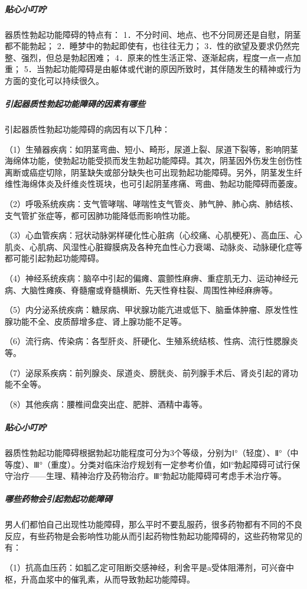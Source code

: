 \subparagraph{贴心小叮咛}

器质性勃起功能障碍的特点有：
1．不分时间、地点、也不分同房还是自慰，阴茎都不能勃起；
2．睡梦中的勃起即使有，也往往无力；
3．性的欲望及要求仍然完整、强烈，但总是勃起困难；
4．原来的性生活正常、逐渐起病，程度一点一点加重；
5．当勃起功能障碍是由躯体或代谢的原因所致时，其伴随发生的精神或行为方面的变化可以持续很久。

\subparagraph{引起器质性勃起功能障碍的因素有哪些}

引起器质性勃起功能障碍的病因有以下几种：

（1）生殖器疾病：如阴茎弯曲、短小、畸形，尿道上裂、尿道下裂等，影响阴茎海绵体功能，使勃起功能受损而发生勃起功能障碍。其次，阴茎因外伤发生创伤性离断或癌症切除，阴茎缺失或部分缺失也可出现勃起功能障碍。另外，阴茎发生纤维性海绵体炎及纤维炎性斑块，也可引起阴茎疼痛、弯曲、勃起功能障碍而萎废。

（2）呼吸系统疾病：支气管哮喘、哮喘性支气管炎、肺气肿、肺心病、肺结核、支气管扩张症等，都可因肺功能降低而影响性功能。

（3）心血管疾病：冠状动脉粥样硬化性心脏病（心绞痛、心肌梗死）、高血压、心肌炎、心肌病、风湿性心脏瓣膜病及各种充血性心力衰竭、动脉炎、动脉硬化症等都可能引起勃起功能障碍。

（4）神经系统疾病：脑卒中引起的偏瘫、震颤性麻痹、重症肌无力、运动神经元病、大脑性瘫痪、脊髓瘤或脊髓横断、先天性脊柱裂、周围性神经麻痹等。

（5）内分泌系统疾病：糖尿病、甲状腺功能亢进或低下、脑垂体肿瘤、原发性性腺功能不全、皮质醇增多症、肾上腺功能不足等。

（6）流行病、传染病：各型肝炎、肝硬化、生殖系统结核、性病、流行性腮腺炎等。

（7）泌尿系疾病：前列腺炎、尿道炎、膀胱炎、前列腺手术后、肾炎引起的肾功能不全等。

（8）其他疾病：腰椎间盘突出症、肥胖、酒精中毒等。

\subparagraph{贴心小叮咛}

器质性勃起功能障碍根据勃起功能程度可分为3个等级，分别为Ⅰ°（轻度）、Ⅱ°（中等度）、Ⅲ°（重度）。分类对临床治疗规划有一定参考价值，如Ⅰ°勃起障碍可试行保守治疗——生理、精神治疗及药物治疗。Ⅲ°勃起功能障碍可考虑手术治疗等。

\subparagraph{哪些药物会引起勃起功能障碍}

男人们都怕自己出现性功能障碍，那么平时不要乱服药，很多药物都有不同的不良反应，有些药物是会影响性功能从而引起药物性勃起功能障碍的，这些药物常见的有：

（1）抗高血压药：如胍乙定可阻断交感神经，利舍平是a受体阻滞剂，可兴奋中枢，升高血浆中的催乳素，从而导致勃起功能障碍。

